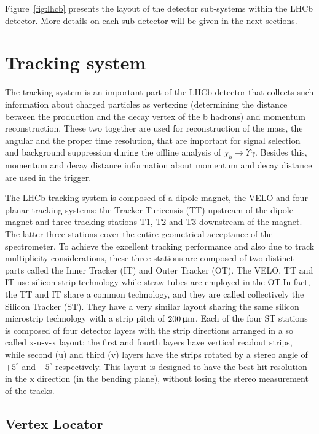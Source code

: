 Figure~\ref{fig:lhcb} presents the layout of the detector sub-systems 
within the LHCb detector. More details on each sub-detector will be given in 
the next sections.

\section{Tracking system}

The tracking system is an important part of the LHCb detector that collects such
information about charged particles as vertexing (determining the distance
between the production and the decay vertex of the b hadrons) and
momentum reconstruction. These two together are used for reconstruction of the mass,
the angular and the proper time resolution, that are important for signal
selection and background suppression during the offline analysis of
$\chi_b \rightarrow \Upsilon \gamma$. Besides this, momentum and decay distance
information about momentum and decay distance are used in the trigger.

The LHCb tracking system is composed of a dipole magnet, the VELO and four 
planar tracking systems: the Tracker Turicensis (TT) upstream of the dipole 
magnet and three tracking stations T1, T2 and T3 downstream of the magnet. 
The latter three stations cover the entire geometrical acceptance of the 
spectrometer. To achieve the excellent tracking performance and also due to 
track multiplicity considerations, these three stations are composed of two 
distinct parts called the Inner Tracker (IT) and Outer Tracker (OT). 
The VELO, TT and IT use silicon strip technology while straw tubes are 
employed in the OT.\@ In fact, the TT and IT share a common technology, 
and they are called collectively the Silicon Tracker (ST). They have a very similar layout
sharing the same silicon microstrip technology with a strip pitch
of $200{\,\upmu\rm m}$. Each of the four ST stations is composed of four detector 
layers with the strip directions arranged in a so called x-u-v-x layout: 
the first and fourth layers have vertical readout strips, while second (u) 
and third (v) layers have the strips rotated by a stereo angle of $+5^\circ$ 
and $-5^\circ$ respectively. This layout is designed to have the best hit
resolution in the x direction (in the bending plane), without losing the 
stereo measurement of the tracks.

\subsection{Vertex Locator}

